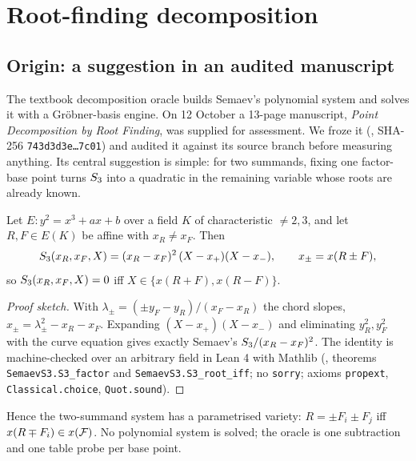\chapter{Root-finding decomposition}\label{sec:rootfinding}

\section{Origin: a suggestion in an audited manuscript}

The textbook decomposition oracle builds Semaev's polynomial system and
solves it with a Gr\"obner-basis engine. On 12 October a 13-page manuscript,
\emph{Point Decomposition by Root Finding}, was supplied for assessment. We
froze it (,
SHA-256 \texttt{743d3d3e\ldots7c01}) and audited it against its source
branch before measuring anything. Its central suggestion is simple: for two
summands, fixing one factor-base point turns $S_{3}$ into a quadratic in the
remaining variable whose roots are already known.

\begin{proposition}\label{prop:s3}
Let $E: y^2=x^3+ax+b$ over a field $K$ of characteristic $\ne2,3$, and let
$R,F\in E(K)$ be affine with $x_R\ne x_F$. Then
\[
  S_{3}(x_R,x_F,X)=(x_R-x_F)^2\,(X-x_+)(X-x_-),\qquad
  x_\pm=x(R\pm F),
\]
so $S_{3}(x_R,x_F,X)=0$ iff $X\in\{x(R+F),x(R-F)\}$.
\end{proposition}
\begin{proof}[Proof sketch]
With $\lambda_\pm=(\pm y_F-y_R)/(x_F-x_R)$ the chord slopes,
$x_\pm=\lambda_\pm^2-x_R-x_F$. Expanding $(X-x_+)(X-x_-)$ and eliminating
$y_R^2,y_F^2$ with the curve equation gives exactly Semaev's
$S_{3}/(x_R-x_F)^2$. The identity is machine-checked over an arbitrary
field in Lean 4 with Mathlib (,
theorems \texttt{SemaevS3.S3\_factor} and \texttt{SemaevS3.S3\_root\_iff};
no \texttt{sorry}; axioms \texttt{propext}, \texttt{Classical.choice},
\texttt{Quot.sound}).
\end{proof}

Hence the two-summand system has a parametrised variety: $R=\pm F_i\pm F_j$
iff $x(R\mp F_i)\in x(\mathcal{F})$. No polynomial system is solved; the oracle is
one subtraction and one table probe per base point.

